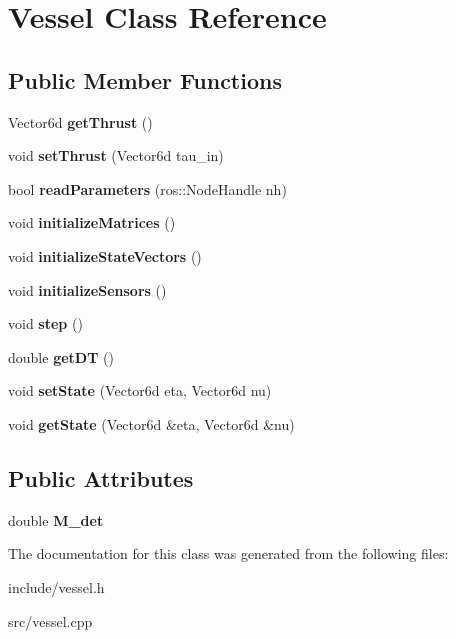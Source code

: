 \section{Vessel Class Reference}
\label{class_vessel}
\subsection*{Public Member Functions}
\begin{DoxyCompactItemize}
\item 
Vector6d {\bfseries get\+Thrust} ()\label{class_vessel_a2ce81e44b7ee78b485fca9fc36e66a80}

\item 
void {\bfseries set\+Thrust} (Vector6d tau\+\_\+in)\label{class_vessel_a5249717b95a643331fede0213ed53d0c}

\item 
bool {\bfseries read\+Parameters} (ros\+::\+Node\+Handle nh)\label{class_vessel_aad41e1742883df3fa8fb6e2f42e49c8e}

\item 
void {\bfseries initialize\+Matrices} ()\label{class_vessel_ac9b3616a8650590abc6f73ce24d840ee}

\item 
void {\bfseries initialize\+State\+Vectors} ()\label{class_vessel_a3cc8cc98ec3d1b3fab2f675047501447}

\item 
void {\bfseries initialize\+Sensors} ()\label{class_vessel_ad8b014067732ad92dc9912884afbd0e9}

\item 
void {\bfseries step} ()\label{class_vessel_a26bd848c65e8697f89106ead6632f512}

\item 
double {\bfseries get\+DT} ()\label{class_vessel_a3f29ece8a16cda2896d7774083ea7f52}

\item 
void {\bfseries set\+State} (Vector6d eta, Vector6d nu)\label{class_vessel_ac57b48a077ff7e815b589ab734c10b05}

\item 
void {\bfseries get\+State} (Vector6d \&eta, Vector6d \&nu)\label{class_vessel_a7946e31d788a7d18ca5b398982c2b29e}

\end{DoxyCompactItemize}
\subsection*{Public Attributes}
\begin{DoxyCompactItemize}
\item 
double {\bfseries M\+\_\+det}\label{class_vessel_a6a8f75c5777179900640c93dc1691a25}

\end{DoxyCompactItemize}


The documentation for this class was generated from the following files\+:\begin{DoxyCompactItemize}
\item 
include/vessel.\+h\item 
src/vessel.\+cpp\end{DoxyCompactItemize}
